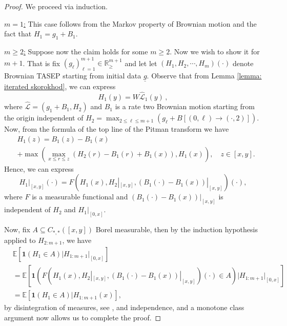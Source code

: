 \documentclass[11pt, reqno]{amsart}
\numberwithin{equation}{section}
\newcommand{\R}{\ensuremath{\mathbb{R}}}
\begin{document}
\begin{proof}
    We proceed via induction.
    
     \underline{$m=1$:} This case follows from the Markov property of Brownian motion and the fact that $H_1 = g_1 + B_1$.
    
    \underline{$m\ge 2$:} Suppose now the claim holds for some $m\ge 2$. Now we wish to show it for $m+1$. That is fix $(g_\ell)_{\ell =1}^{m+1} \in\R^{m+1}_{\ge}$ and let 
     let $(H_1, H_2, \cdots, H_m)(\cdot)$ denote Brownian TASEP starting from initial data $\underline{g}$. Observe that from Lemma \ref{lemma: iterated skorokhod}, we can express 
    \[
    H_{1}(y) = W\hat{\mathcal{L}}_1(y)\,,
    \]
where $\hat{\mathcal{L}} = (g_1+B_1, H_2)$ and $B_1$ is a rate two Brownian motion starting from the origin independent of $H_2 = \displaystyle\max_{2\le \ell \le m+1}(g_{\ell} + B[(0,\ell)\to (\cdot, 2)])$. Now, from the formula of the top line of the Pitman transform we have
\begin{equation*}
    \begin{array}{cc}
        &H_{1}(z) = B_1(z)-B_1(x)\\
        &+\displaystyle\max\left(\max_{x\leq r\leq z}(H_2(r)-B_1(r)+B_1(x)),H_{1}(x)\right), \quad z\in [x,y].
    \end{array}
\end{equation*}
Hence, we can express 
\begin{equation*}
    H_{1}|_{[x,y]}(\cdot) = F(H_{1}(x), H_2|_{[x,y]}, (B_1(\cdot)-B_1(x))|_{[x, y]})(\cdot),
\end{equation*}
where $F$ is a measurable functional and $(B_1(\cdot)-B_1(x))|_{[x, y]}$ is independent of $H_2$ and $H_{1}|_{[0,x]}$.

Now, fix $A\subseteq C_{*, *} ([x,y])$ Borel measurable, then by the induction hypothesis applied to $H_{2:m+1}$, we have
\begin{equation*}
\begin{array}{cc}
     &\mathbb{E}\left[ \mathbf{1}(H_{1}\in A) \Big| H_{1:m+1}|_{[0,x]}\right]\\ &=  \mathbb{E}\left[ \mathbf{1}(F(H_1(x), H_2|_{[x,y]}, (B_1(\cdot)-B_1(x))|_{[x, y]})(\cdot)\in A) \Big| H_{1:m+1}|_{[0,x]}\right]\\
     & =  \mathbb{E}\left[ \mathbf{1}(H_1\in A) \Big| H_{1:m+1}(x)\right],
\end{array}
\end{equation*}
by disintegration of measures, see \cite{kallenberg1997foundations}, and independence, and a monotone class argument now allows us to complete the proof.
\end{proof}
\end{document}
